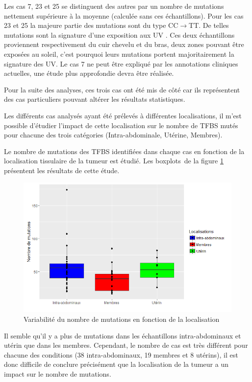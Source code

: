 Les cas 7, 23 et 25 se distinguent des autres par un nombre de mutations nettement supérieure à la moyenne (calculée sans ces échantillons). Pour les cas 23 et 25 la majeure partie des mutations sont du type CC$\rightarrow$TT. De telles mutations sont la signature d'une exposition aux UV \citep{signature}. Ces deux échantillons proviennent respectivement du cuir chevelu et du bras, deux zones pouvant être exposées au soleil, c'est pourquoi leurs mutations portent majoritairement la signature des UV.
Le cas 7 ne peut être expliqué par les annotations cliniques actuelles, une étude plus approfondie devra être réalisée.

Pour la suite des analyses, ces trois cas ont été mis de côté car ils représentent des cas particuliers pouvant altérer les résultats statistiques.

Les différents cas analysés ayant été prélevés à différentes localisations, il m'est possible d'étudier l'impact de cette localisation sur le nombre de TFBS mutés pour chacune des trois catégories (Intra-abdominale, Utérine, Membres).

\newpage

Le nombre de mutations des TFBS identifiées dans chaque cas en fonction de la localisation tissulaire de la tumeur est étudié. Les \og boxplots\fg ~de la figure \ref{fig:mut_n} présentent les résultats de cette étude.

\begin{figure}[h]
\centering
\includegraphics[scale=0.5]{Figures/number_mutations.png} 
    \caption{Variabilité du nombre de mutations en fonction de la localisation} 
    \label{fig:mut_n}
\end{figure} 

Il semble qu'il y a plus de mutations dans les échantillons intra-abdominaux et utérin que dans les membres. Cependant, le nombre de cas est très différent pour chacune des conditions (38 intra-abdominaux, 19 membres et 8 utérins), il est donc difficile de conclure précisément que la localisation de la tumeur a un impact sur le nombre de mutations.

